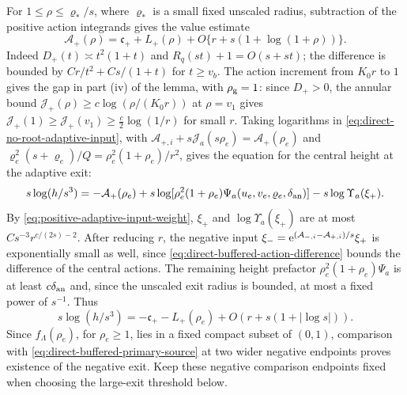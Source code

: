 For \(1\le\rho\le\varrho_*/s\), where \(\varrho_*\) is a small
fixed unscaled radius, subtraction of the positive
action integrands gives the value estimate
\[
 \mathcal A_+(\rho)=\mathfrak c_++L_+(\rho)
            +O\{r+s(1+\log(1+\rho))\}.
\]
Indeed \(D_+(t)\asymp t^2(1+t)\) and
\(R_q(st)+1=O(s+st)\); the difference is bounded by
\(Cr/t^2+Cs/(1+t)\) for \(t\ge v_b\).
The action increment from \(K_0r\) to \(1\) gives the gap in part
(iv) of the lemma, with \(\rho_{\rm g}=1\): since \(D_+>0\), the annular
bound \(\mathcal J_+(\rho)\ge c\log(\rho/(K_0r))\) at \(\rho=v_1\) gives
\(\mathcal J_+(1)\ge \mathcal J_+(v_1)\ge\frac c2\log(1/r)\) for small \(r\).
Taking logarithms in \eqref{eq:direct-no-root-adaptive-input}, with
\(\mathcal A_{+,i}+s\mathcal J_a(s\rho_e)=\mathcal A_+(\rho_e)\) and
\(\varrho_e^2(s+\varrho_e)/Q=\rho_e^2(1+\rho_e)/r^2\), gives the equation
for the central height at the adaptive exit:
\[
 s\log(h/s^3)=-\mathcal A_+(\rho_e)
   +s\log[\rho_e^2(1+\rho_e)\Psi_a(u_e,v_e,\varrho_e,\delta_{\rm an})]
   -s\log\Upsilon_a(\xi_+).
\]
By \eqref{eq:positive-adaptive-input-weight}, \(\xi_+\) and
\(\log\Upsilon_a(\xi_+)\) are at most \(Cs^{-3}r^{c/(2s)-2}\). After
reducing \(r\), the negative input
\(\xi_-=\mathrm e^{(\mathcal A_{-,i}-\mathcal A_{+,i})/s}\xi_+\) is exponentially
small as well, since
\eqref{eq:direct-buffered-action-difference} bounds the difference of the
central actions. The remaining height prefactor
\(\rho_e^2(1+\rho_e)\Psi_a\) is at least \(c\delta_{\rm an}\) and, since the
unscaled exit radius is bounded, at most a fixed power of \(s^{-1}\).
Thus
\[
 s\log(h/s^3)=-\mathfrak c_+-L_+(\rho_e)
                    +O(r+s(1+|\log s|)).
\]
Since \(f_\Lambda(\rho_e)\), for \(\rho_e\ge1\), lies
in a fixed compact subset of \((0,1)\), comparison with
\eqref{eq:direct-buffered-primary-source} at two wider
negative endpoints proves existence of the negative exit.
Keep these negative comparison endpoints fixed when choosing the
large-exit threshold below.

